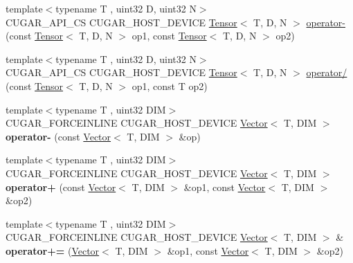 \begin{DoxyCompactItemize}
\item 
{\footnotesize template$<$typename T , uint32 D, uint32 N$>$ }\\C\+U\+G\+A\+R\+\_\+\+A\+P\+I\+\_\+\+CS C\+U\+G\+A\+R\+\_\+\+H\+O\+S\+T\+\_\+\+D\+E\+V\+I\+CE \hyperlink{structcugar_1_1_tensor}{Tensor}$<$ T, D, N $>$ \hyperlink{namespacecugar_a6862e74ffbc35f96c6f26f1e18f61cda}{operator-\/} (const \hyperlink{structcugar_1_1_tensor}{Tensor}$<$ T, D, N $>$ op1, const \hyperlink{structcugar_1_1_tensor}{Tensor}$<$ T, D, N $>$ op2)
\item 
{\footnotesize template$<$typename T , uint32 D, uint32 N$>$ }\\C\+U\+G\+A\+R\+\_\+\+A\+P\+I\+\_\+\+CS C\+U\+G\+A\+R\+\_\+\+H\+O\+S\+T\+\_\+\+D\+E\+V\+I\+CE \hyperlink{structcugar_1_1_tensor}{Tensor}$<$ T, D, N $>$ \hyperlink{namespacecugar_a4b1437e64b7ca07fd7d7c1e1b47cb93e}{operator/} (const \hyperlink{structcugar_1_1_tensor}{Tensor}$<$ T, D, N $>$ op1, const T op2)
\item 
\mbox{\label{namespacecugar_a25527527f745d26e7984fe1bb6356757}} 
{\footnotesize template$<$typename T , uint32 D\+IM$>$ }\\C\+U\+G\+A\+R\+\_\+\+F\+O\+R\+C\+E\+I\+N\+L\+I\+NE C\+U\+G\+A\+R\+\_\+\+H\+O\+S\+T\+\_\+\+D\+E\+V\+I\+CE \hyperlink{structcugar_1_1_vector}{Vector}$<$ T, D\+IM $>$ {\bfseries operator-\/} (const \hyperlink{structcugar_1_1_vector}{Vector}$<$ T, D\+IM $>$ \&op)
\item 
\mbox{\label{namespacecugar_af3272c73e74bd4b054b391589b985e33}} 
{\footnotesize template$<$typename T , uint32 D\+IM$>$ }\\C\+U\+G\+A\+R\+\_\+\+F\+O\+R\+C\+E\+I\+N\+L\+I\+NE C\+U\+G\+A\+R\+\_\+\+H\+O\+S\+T\+\_\+\+D\+E\+V\+I\+CE \hyperlink{structcugar_1_1_vector}{Vector}$<$ T, D\+IM $>$ {\bfseries operator+} (const \hyperlink{structcugar_1_1_vector}{Vector}$<$ T, D\+IM $>$ \&op1, const \hyperlink{structcugar_1_1_vector}{Vector}$<$ T, D\+IM $>$ \&op2)
\item 
\mbox{\label{namespacecugar_a05e36806db8c8323aadd9fafdf964e48}} 
{\footnotesize template$<$typename T , uint32 D\+IM$>$ }\\C\+U\+G\+A\+R\+\_\+\+F\+O\+R\+C\+E\+I\+N\+L\+I\+NE C\+U\+G\+A\+R\+\_\+\+H\+O\+S\+T\+\_\+\+D\+E\+V\+I\+CE \hyperlink{structcugar_1_1_vector}{Vector}$<$ T, D\+IM $>$ \& {\bfseries operator+=} (\hyperlink{structcugar_1_1_vector}{Vector}$<$ T, D\+IM $>$ \&op1, const \hyperlink{structcugar_1_1_vector}{Vector}$<$ T, D\+IM $>$ \&op2)

\end{DoxyCompactItemize}
